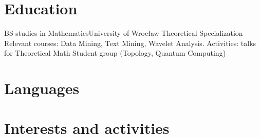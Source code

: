 \documentclass[11pt,a4paper]{moderncv}
\begin{document}
\newpage
\section{Education}
{BS studies in Mathematics}{University of Wrocław}{}{}
{Theoretical Specialization
Relevant courses: Data Mining, Text Mining, Wavelet Analysis. Activities: talks for Theoretical Math Student group (Topology, Quantum Computing)
}

 
\section{Languages}



\section{Interests and activities}

\closesection{}
\renewcommand{\listitemsymbol}{-}
\end{document}
